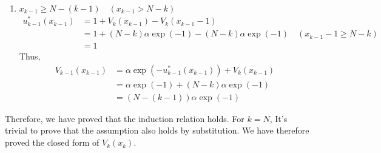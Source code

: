 \documentclass[11pt, a4paper, oneside]{memoir}
\begin{document}
\begin{enumerate}
  \item $x_{k-1} \geq N-(k-1) \quad (x_{k-1} > N-k)$
        \begin{align*}
          u_{k-1}^*(x_{k-1}) & = 1 + V_k(x_{k-1}) - V_k(x_{k-1}-1)                                          \\
                             & = 1 + (N-k)\alpha \exp(-1) - (N-k)\alpha \exp(-1) \quad (x_{k-1}-1 \geq N-k) \\
                             & = 1
        \end{align*}
        Thus,
        \begin{align*}
          V_{k-1}(x_{k-1}) & = \alpha \exp(-u_{k-1}^*(x_{k-1})) + V_k(x_{k-1}) \\
                           & = \alpha \exp(-1) + (N-k)\alpha \exp(-1)          \\
                           & = (N-(k-1)) \alpha \exp(-1)
        \end{align*}
\end{enumerate}

Therefore, we have proved that the induction relation holds.
For $k=N$, It's trivial to prove that the assumption also holds by substitution. We have therefore proved the closed form of $V_k(x_k)$.

\end{document}
